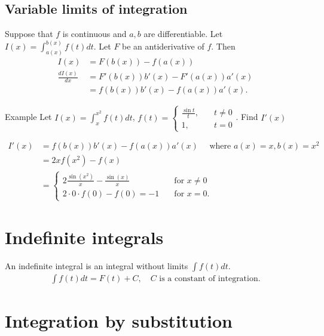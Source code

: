 \documentclass{report}
\begin{document}
	\subsection{Variable limits of integration}

	Suppose that $f$ is continuous and $a,b$ are differentiable. Let $I(x) = \displaystyle\int_{a(x)}^{b(x)} f(t) dt$. Let $F$ be an antiderivative of $f$. Then
	\begin{align*}
		I(x) &= F(b(x)) - f(a(x))	\\
		\frac{dI(x)}{dx} &= F'(b(x))b'(x) - F'(a(x))a'(x)	\\
						 &= f(b(x))b'(x) - f(a(x))a'(x).
	\end{align*}

	\begin{question}{Example}
		Let $I(x) = \displaystyle\int_x^{x^2} f(t) dt$, $f(t) = \begin{cases} \frac{\sin t}{t}, &\quad t \neq 0 \\ 1, & \quad t = 0\end{cases}$. Find $I'(x)$

		\begin{align*}
			I'(x) &= f(b(x))b'(x) - f(a(x))a'(x)	\quad \text{ where $a(x) = x, b(x) = x^2$}	\\
				  &= 2xf(x^2) - f(x)	\\
				  &= \begin{cases}
					  2 \frac{\sin (x^2)}{x} - \frac{\sin (x)}{x} & \quad \text{for } x \neq 0	\\
					  2 \cdot 0 \cdot f(0) - f(0) = -1 &\quad \text{for } x = 0.
				  \end{cases}
		\end{align*}
	\end{question}

	\section{Indefinite integrals}

	An indefinite integral is an integral without limits $\displaystyle\int f(t) dt.$
	\begin{align*}
		\int f(t)dt = F(t) + C, \quad C \text{ is a constant of integration}.
	\end{align*}

	\section{Integration by substitution}
\end{document}

